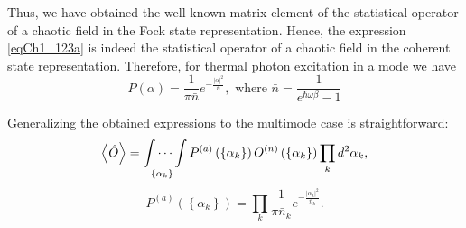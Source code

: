 Thus, we have obtained the well-known matrix element of the statistical operator of a chaotic field in the Fock state representation. Hence, the expression \eqref{eqCh1_123a} is indeed the statistical operator of a chaotic field in the coherent state representation. Therefore, for thermal photon excitation in a mode we have
\begin{equation}
P\left(\alpha\right) = \frac{1}{\pi \bar{n}}
e^{-\frac{\left|\alpha\right|^2}{\bar{n}}},
\mbox{ where }
\bar{n} = \frac{1}{e^{\hbar \omega \beta} - 1}
\label{eqCh1_task4}
\end{equation}
  
Generalizing the obtained expressions to the multimode case is straightforward: 
\begin{equation}
\left<\hat{O}\right> = \idotsint\limits_{\left\{\alpha_k\right\}}
P^{(a)}
\left(
\left\{\alpha_k\right\}
\right)
O^{(n)}
\left(
\left\{\alpha_k\right\}
\right)
\prod_k d^2 \alpha_k,
\label{eqCh1_113}
\end{equation}
\[
P^{(a)}
\left(
\left\{\alpha_k\right\}
\right)
=
\prod_k \frac{1}{\pi \bar{n}_k}
e^{-\frac{\left|\alpha_k\right|^2}{\bar{n}_k}}. 
\]
